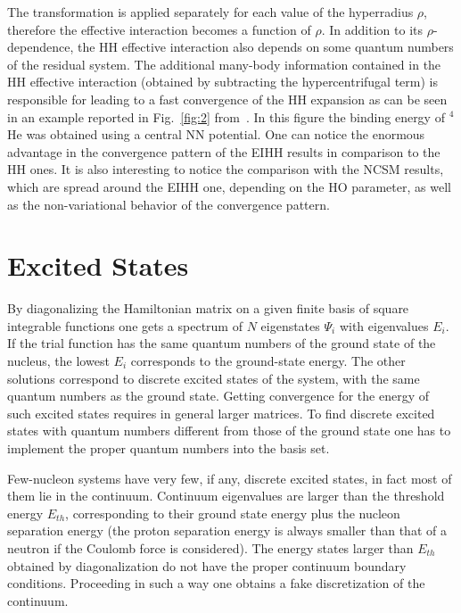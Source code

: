 The  transformation is applied separately for each value of the hyperradius $\rho$,
therefore the effective interaction becomes a function of $\rho$.
In addition to its $\rho$-dependence, the HH effective interaction
also depends on some quantum numbers of the
residual system. The  additional many-body information contained in the HH effective interaction 
(obtained by subtracting the hypercentrifugal term) is responsible for 
leading to a fast convergence of the HH expansion as can be seen in an example reported in Fig.~\ref{fig:2} from~\cite{BaL00}.
In this figure the binding energy of $^4$He was obtained using a central NN potential. One can notice the enormous advantage 
in the convergence pattern of the EIHH results in comparison to the HH ones. It is also interesting to notice the comparison with the NCSM 
results, which are spread around the EIHH one, depending on the HO parameter, as well as the non-variational behavior 
of the convergence pattern.


\section{Excited States}\label{sec:EXCITED}
By diagonalizing the Hamiltonian matrix on a given finite basis of square integrable functions one gets a spectrum of $N$
eigenstates $\Psi_i$ with eigenvalues $E_i$. If the trial function has the same quantum numbers of the ground state
of the nucleus,  the lowest $E_i$ corresponds to the ground-state energy. The other solutions correspond to discrete excited 
states of the system, 
with the same quantum numbers as the ground state. Getting convergence for the energy of such excited states requires 
in general larger matrices. 
To find discrete excited states with quantum numbers different from those of the ground state one has to implement 
the proper quantum numbers into the basis set.

Few-nucleon systems have very few, if any, discrete excited states, in fact most of them lie 
in the continuum. Continuum eigenvalues 
are larger than the threshold energy $E_{th}$, corresponding to their ground state energy plus
the nucleon separation energy (the proton separation energy 
is always smaller than that of a neutron if the Coulomb force is considered). 
The  energy states larger than $E_{th}$ obtained by diagonalization do not have the proper 
continuum boundary conditions. 
Proceeding in such a way one obtains a fake discretization of the continuum. 


